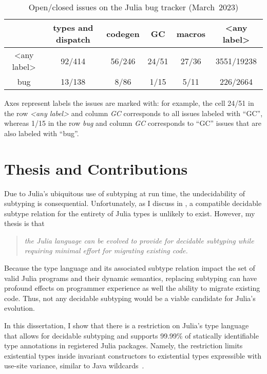 \begin{table}[t]
\begin{threeparttable}
\centering\footnotesize
\begin{tabular}{c|ccccc}
 & types and dispatch & codegen & GC & macros & <any label> \\
\midrule
<any label> &
  92/414 & 56/246 & 24/51 & 27/36 & 3551/19238 \\
bug &
  13/138 & 8/86 & 1/15 & 5/11 & 226/2664
\end{tabular}
\caption{Open/closed issues on the Julia bug tracker
(March~2023)}\label{tab:julia-issues-stats}
\begin{tablenotes}[para]
\small
Axes represent labels the issues are marked with: for example, the cell
24/51 in the row \emph{<any label>} and column \emph{GC} corresponds to all
issues labeled with {``GC''}, whereas 1/15 in the row \emph{bug} and column 
\emph{GC} corresponds to {``GC''} issues that are also labeled with {``bug''}.
\end{tablenotes}
\end{threeparttable}
\end{table}

\section{Thesis and Contributions}

Due to Julia's ubiquitous use of subtyping at run time,
the undecidability of subtyping is consequential.
Unfortunately, as I discuss in ,
a compatible decidable subtype relation for the entirety of Julia types
is unlikely to exist.
However, my thesis is that
\begin{quotation}\emph{
  the Julia language can be evolved to provide for decidable subtyping while
  requiring minimal effort for migrating existing code.
}\end{quotation}

Because the type language and its associated subtype relation 
impact the set of valid Julia programs and their dynamic semantics,
replacing subtyping can have profound effects on programmer experience 
as well the ability to migrate existing code.
Thus, not any decidable subtyping would be a viable candidate for
Julia's evolution.

In this dissertation, I show that there is
a restriction on Julia's type language that allows for decidable subtyping
and supports 99.99\% of statically identifiable type annotations
in registered Julia packages.
Namely, the restriction limits existential types inside invariant constructors
to existential types expressible with use-site variance,
similar to Java wildcards~\cite{bib:torgersen:wildcards:2004}.

